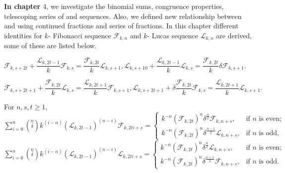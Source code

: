\begin{large}
\noindent \textbf{In chapter  $4$}, we investigate the binomial sums, congruence properties, telescoping series of \kF\vspace{1mm} and \kL\vspace{.5mm} sequences. Also, we defined new relationship between \kF\vspace{1mm} and \kL\vspace{.5mm} using continued fractions and series of fractions.
\noindent In this chapter different identities for $k$- Fibonacci sequence $\mathcal{F}_{k,n}$ and $k$- Lucas sequence $\mathcal{L}_{k,n}$ are derived, some of these are listed below. 
 \begin{theorem} 
$\mathcal{F}_{k,s+2t}+\dfrac{\mathcal{L}_{k,2t-1}}{k}\mathcal{F}_{k,s}=\dfrac{\mathcal{F}_{k,2t}}{k}\mathcal{L}_{k,s+1},
\mathcal{L}_{k,s+10}+\dfrac{\mathcal{L}_{k,2t-1}}{k}\mathcal{L}_{k,s}=\dfrac{\mathcal{F}_{k,2t}}{k}\delta\mathcal{F}_{k,s+1}.$
 \end{theorem}
  \begin{theorem} 
  $\mathcal{F}_{k,s+2t+1}+\dfrac{\mathcal{F}_{k,2t}}{k}\mathcal{L}_{k,s}=\dfrac{\mathcal{L}_{k,2t+1}}{k}\mathcal{F}_{k,s+1},
\mathcal{L}_{k,s+2t+1}+\delta\dfrac{\mathcal{F}_{k,2t}}{k}\mathcal{F}_{k,s}=\dfrac{\mathcal{L}_{k,2t+1}}{k}\mathcal{L}_{k,s+1}.$
 \end{theorem}
   \begin{theorem} For $n, s,t\geq 1$,\\$\sum\limits_{i=0}^{n}\left( \stackrel{n}{i}\right)k^{(i-n)}(\mathcal{L}_{k,2t-1})^{(n-i)}\mathcal{F}_{k,2ti+s}=\begin{cases} 
k^{-n}(\mathcal{F}_{k,2t})^n\delta^{\frac{n}{2}}\mathcal{F}_{k,n+s},& \text{if $n$ is even;}\\
k^{-n}(\mathcal{F}_{k,2t})^n\delta^{\frac{n-1}{2}}\mathcal{L}_{k,n+s},& \text{if $n$ is odd,}\end{cases} $\\
$\sum\limits_{i=0}^{n}\left( \stackrel{n}{i}\right)k^{(i-n)}(\mathcal{L}_{k,2t-1})^{(n-i)}\mathcal{L}_{k,2ti+s}=\begin{cases} 
k^{-n}(\mathcal{F}_{k,2t})^n\delta^{\frac{n}{2}}\mathcal{L}_{k,n+s},& \text{if $n$ is even;}\\
k^{-n}(\mathcal{F}_{k,2t})^n\delta^{\frac{n+1}{2}}\mathcal{F}_{k,n+s},& \text{if $n$ is odd.}
\end{cases} $ 
\end{theorem}
\end{large}
